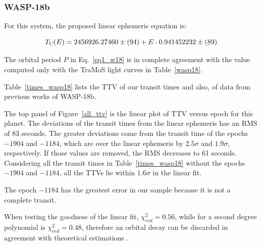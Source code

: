 \subsubsection{WASP-18b}
For this system, the proposed linear ephemeris equation is:

\begin{equation} \label{eq1_w18}
T_{\rm C}(E)=2456926.27460\pm(94)+E \cdot 0.941452232\pm(89)
\end{equation}

The orbital period $P$ in Eq.~\ref{eq1_w18} is in complete agreement with the value computed only with the TraMoS light curves in Table~\ref{wasp18}.

Table~\ref{times_wasp18} lists the TTV of our transit times and also, of data from previous works \citep{Triaud2010,Hellier2009,Maxted2013b} of WASP-18b. 

The top panel of Figure~\ref{all_ttv} is the linear plot of TTV versus epoch for this planet. The deviations of the transit times from the linear ephemeris has an RMS of 83 seconds. The greater deviations come from the transit time of the epochs $-1904$ and $-1184$, which are over the linear ephemeris by $2.5\sigma$ and $1.9\sigma$, respectively. If those values are removed, the RMS decreases to 61 seconds. Considering all the transit times in Table~\ref{times_wasp18} without the epochs $-1904$ and $-1184$, all the TTVs lie within $1.6\sigma$ in the linear fit. 

The epoch $-1184$ has the greatest error in our sample because it is not a complete transit.

When testing the goodness of the linear fit, $\chi^{2}_{red} =0.56$, while for a second degree polynomial is $\chi^{2}_{red}=0.48$, therefore an orbital decay can be discarded in agreement with theoretical estimations \citep{CollierCameron2018}.  

